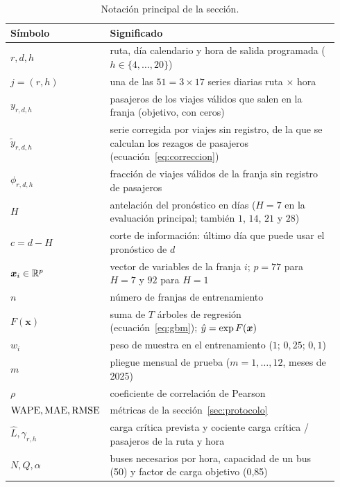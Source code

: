\begin{table}[t]
  \centering\small
  \caption{Notación principal de la sección.}
  \label{tab:notacion}
  \begin{tabular}{@{}>{\raggedright\arraybackslash}p{0.2\linewidth} >{\raggedright\arraybackslash}p{0.74\linewidth}@{}}
    \toprule
    Símbolo & Significado \\
    \midrule
    $r, d, h$ & ruta, día calendario y hora de salida programada ($h \in \{4,\dots,20\}$) \\
    $j = (r, h)$ & una de las $51 = 3 \times 17$ series diarias ruta $\times$ hora \\
    $y_{r,d,h}$ & pasajeros de los viajes válidos que salen en la franja (objetivo, con ceros) \\
    $\tilde{y}_{r,d,h}$ & serie corregida por viajes sin registro, de la que se calculan los rezagos de pasajeros (ecuación~\eqref{eq:correccion}) \\
    $\phi_{r,d,h}$ & fracción de viajes válidos de la franja sin registro de pasajeros \\
    $H$ & antelación del pronóstico en días ($H = 7$ en la evaluación principal; también $1$, $14$, $21$ y $28$) \\
    $c = d - H$ & corte de información: último día que puede usar el pronóstico de $d$ \\
    $\bm{x}_i \in \mathbb{R}^{p}$ & vector de variables de la franja $i$; $p = 77$ para $H = 7$ y $92$ para $H = 1$ \\
    $n$ & número de franjas de entrenamiento \\
    $F(\bm{x})$ & suma de $T$ árboles de regresión (ecuación~\eqref{eq:gbm}); $\hat{y} = \exp F(\bm{x})$ \\
    $w_i$ & peso de muestra en el entrenamiento ($1$; $0{,}25$; $0{,}1$) \\
    $m$ & pliegue mensual de prueba ($m = 1,\dots,12$, meses de 2025) \\
    $\rho$ & coeficiente de correlación de Pearson \\
    $\mathrm{WAPE}, \mathrm{MAE}, \mathrm{RMSE}$ & métricas de la sección~\ref{sec:protocolo} \\
    $\hat{L}, \gamma_{r,h}$ & carga crítica prevista y cociente carga crítica / pasajeros de la ruta y hora \\
    $N, Q, \alpha$ & buses necesarios por hora, capacidad de un bus (50) y factor de carga objetivo (0,85) \\
    \bottomrule
  \end{tabular}
\end{table}

